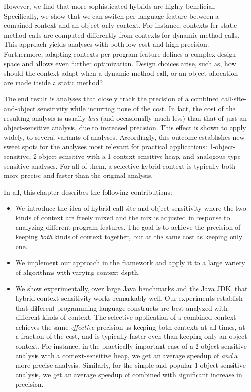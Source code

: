 However, we find that more sophisticated hybrids are highly beneficial. Specifically, we show that we can switch per-language-feature between a combined context and an object-only context. For instance, contexts for static method calls are computed differently from contexts for dynamic method calls. This approach yields analyses with both low cost and high precision. Furthermore, adapting contexts per program feature defines a complex design space and allows even further optimization. Design choices arise, such as, how should the context adapt when a dynamic method call, or an object allocation are made inside a static method?

The end result is analyses that closely track the precision of a combined call-site-and-object sensitivity while incurring none of the cost. In fact, the cost of the resulting analysis is usually \emph{less} (and occasionally much less) than that of just an object-sensitive analysis, due to increased precision. This effect is shown to apply widely, to several variants of analyses. Accordingly, this outcome establishes new sweet spots for the analyses most relevant for practical applications: 1-object-sensitive, 2-object-sensitive with a 1-context-sensitive heap, and analogous type-sensitive \cite{popl:2011:Smaragdakis} analyses. For all of them, a selective hybrid context is typically both more precise and faster than the original analysis.

In all, this chapter describes the following contributions:

\begin{itemize}
\item We introduce the idea of hybrid call-site and object sensitivity where the two kinds of context are freely mixed and the mix is adjusted in response to analyzing different program features. The goal is to achieve the precision of keeping \emph{both} kinds of context together, but at the same cost as keeping only one.

\item We implement our approach in the \doop{} framework and apply it to a large variety of algorithms with varying context depth.

\item We show experimentally, over large Java benchmarks and the Java JDK, that hybrid-context sensitivity works remarkably well. Our experiments establish that different programming language constructs are best analyzed with different kinds of context. The selective application of a combined context achieves the same \emph{effective} precision as keeping both contexts at all times, at a fraction of the cost, and is typically faster even than keeping only an object context. For instance, in the practically important case of a 2-object-sensitive analysis with a context-sensitive heap, we get an average speedup of  \emph{and} a more precise analysis. Similarly, for the simple and popular 1-object-sensitive analysis, we get an average speedup of  combined with significant increase in precision.
\end{itemize}


